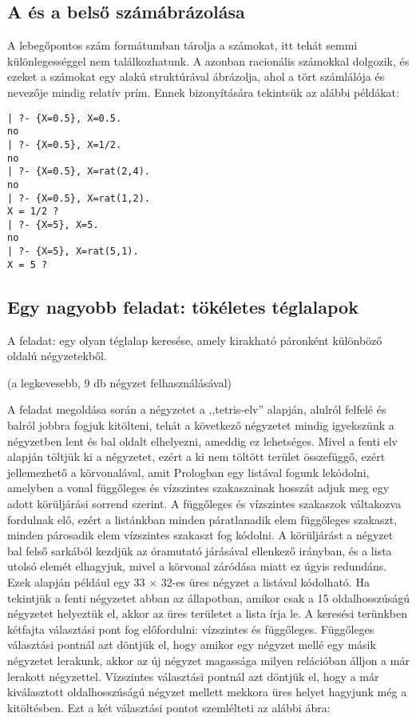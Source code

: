 \subsection{A \clpq és a \clpr belső számábrázolása}

A \clpr lebegőpontos szám formátumban tárolja a számokat, itt tehát
semmi különlegességgel nem találkozhatunk. A \clpq azonban racionális
számokkal dolgozik, és ezeket a számokat egy 
alakú struktúrával ábrázolja, ahol a tört számlálója és nevezője mindig
relatív prím. Ennek bizonyítására tekintsük az alábbi \clpq példákat:

\begin{verbatim}
| ?- {X=0.5}, X=0.5.
no
| ?- {X=0.5}, X=1/2.
no
| ?- {X=0.5}, X=rat(2,4).
no
| ?- {X=0.5}, X=rat(1,2).
X = 1/2 ?
| ?- {X=5}, X=5.
no
| ?- {X=5}, X=rat(5,1).
X = 5 ?
\end{verbatim}

\subsection{Egy nagyobb \clpq feladat: tökéletes téglalapok}

\label{teglalap:clpqr}

A feladat: egy olyan téglalap keresése, amely kirakható páronként különböző
oldalú négyzetekből.

(a legkevesebb, 9 db négyzet felhasználásával)
\begin{center}
\end{center}

A feladat megoldása során a négyzetet a ,,tetris-elv'' alapján, alulról
felfelé és balról jobbra fogjuk kitölteni, tehát a következő négyzetet
mindig igyekszünk a négyzetben lent és bal oldalt elhelyezni, ameddig
ez lehetséges. Mivel a fenti elv alapján töltjük ki a négyzetet, ezért a
ki nem töltött terület összefüggő, ezért jellemezhető a körvonalával, amit
Prologban egy listával fogunk lekódolni, amelyben a vonal függőleges és
vízszintes szakaszainak hosszát adjuk meg egy adott körüljárási sorrend
szerint. A függőleges és vízszintes szakaszok váltakozva fordulnak elő,
ezért a listánkban minden páratlanadik elem függőleges szakaszt, minden
párosadik elem vízszintes szakaszt fog kódolni. A körüljárást a négyzet
bal felső sarkából kezdjük az óramutató járásával ellenkező irányban, és
a lista utolsó elemét elhagyjuk, mivel a körvonal záródása miatt ez úgyis
redundáns. Ezek alapján például egy 33 $\times$ 32-es üres négyzet a
\cd{[-32,33,32]} listával kódolható. Ha tekintjük a fenti négyzetet abban
az állapotban, amikor csak a 15 oldalhosszúságú négyzetet helyeztük el,
akkor az üres területet a \cd{[-17,15,-15,18,32]} lista írja le.
\br
A keresési terünkben kétfajta választási pont fog előfordulni: vízszintes
és függőleges. Függőleges választási pontnál azt döntjük el, hogy amikor
egy négyzet mellé egy másik négyzetet lerakunk, akkor az új négyzet magassága
milyen relációban álljon a már lerakott négyzettel. Vízszintes választási
pontnál azt döntjük el, hogy a már kiválasztott oldalhosszúságú négyzet
mellett mekkora üres helyet hagyjunk még a kitöltésben. Ezt a két választási
pontot szemlélteti az alábbi ábra:

